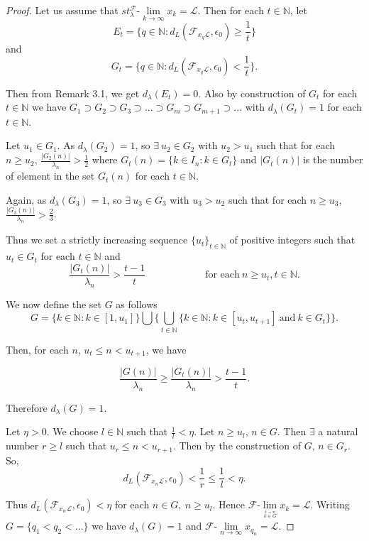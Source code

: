 \documentclass[reqno,b5paper]{amsart}
\theoremstyle{plain}
\theoremstyle{definition}
\begin{document}
\begin{proof}
Let us assume that
$st^\mathcal{F}_\lambda\mbox{-}\lim\limits_{k\rightarrow\infty}x_k=\mathcal{L}$.
Then for each $t\in\mathbb{N}$, let
$$E_t=\{q\in \mathbb{N}:d_L(\mathcal{F}_{x_q\mathcal{L}},\epsilon_0)\geq\frac{1}{t}\}$$
and
$$G_t=\{q\in \mathbb{N}:d_L(\mathcal{F}_{x_q\mathcal{L}},\epsilon_0)<\frac{1}{t}\}.$$

Then from Remark 3.1, we get $d_\lambda(E_t)=0$. Also by
construction of $G_t$ for each $t\in \mathbb{N}$ we have
$G_1\supset G_2\supset G_3\supset...\supset G_m\supset
G_{m+1}\supset...$ with $d_\lambda(G_t)=1$ for each
$t\in\mathbb{N}$.

Let $u_1\in G_1$. As $d_\lambda(G_2)=1$, so $\exists ~u_2\in G_2$
with $u_2>u_1$ such that for each $n\geq u_2$,
$\frac{\left|G_2(n)\right|}{\lambda_n}>\frac{1}{2}$ where
$G_t(n)=\{k\in I_n: k\in G_t\}$ and $\left|G_t(n)\right|$ is the
number of element in the set $G_t(n)$ for each $t\in \mathbb{N}$.

Again, as $d_\lambda(G_3)=1$, so $\exists~u_3\in G_3$ with
$u_3>u_2$ such that for each $n\geq u_3$,
$\frac{\left|G_3(n)\right|}{\lambda_n}>\frac{2}{3}$.

Thus we set a strictly increasing sequence
$\{u_t\}_{t\in\mathbb{N}}$ of positive integers such that $u_t\in
G_t$ for each $t\in\mathbb{N}$ and
$$\frac{\left|G_t(n)\right|}{\lambda_n}>\frac{t-1}{t} \hspace{1in} \text{for each}~n\geq u_t, t\in\mathbb{N}.$$

We now define the set $G$ as follows
$$G=\biggl\{k\in\mathbb{N}:k\in[1,u_1]\biggr\}\bigcup\biggl\{\bigcup\limits_{t\in\mathbb{N}}\{k\in\mathbb{N}:k\in[u_t,u_{t+1}]~\text{and}~k\in G_t\}\biggr\}.$$

Then, for each $n$, $u_t\leq n<u_{t+1}$, we have

$$\frac{\left|G(n)\right|}{\lambda_n}\geq\frac{\left|G_t(n)\right|}{\lambda_n}>\frac{t-1}{t}.$$

Therefore $d_\lambda(G)=1$.

Let $\eta>0$. We choose $l\in\mathbb{N}$ such that
$\frac{1}{l}<\eta$. Let $n\geq u_l$, $n\in G$. Then $\exists$ a
natural number $r\geq l$ such that $u_r\leq n<u_{r+1}$. Then by
the construction of $G$, $n\in G_r$. So,
$$d_L(\mathcal{F}_{x_n\mathcal{L}},\epsilon_0)<\frac{1}{r}\leq\frac{1}{l}<\eta.$$

Thus $d_L(\mathcal{F}_{x_n\mathcal{L}},\epsilon_0)<\eta$ for each
$n\in G,~n\geq u_l$. Hence
$\mathcal{F}\mbox{-}\lim\limits_{\stackrel{\stackrel{k\rightarrow\infty}{k\in
G}}~}x_k=\mathcal{L}$. Writing $G=\{q_1<q_2<...\}$ we have
$d_\lambda(G)=1$ and
$\mathcal{F}\mbox{-}\lim\limits_{n\rightarrow\infty}x_{q_n}=\mathcal{L}$.


\end{proof}
\end{document}
